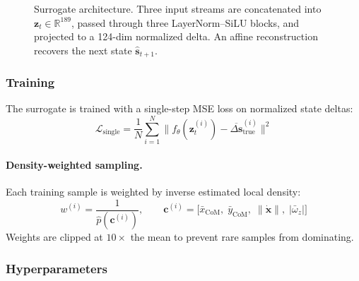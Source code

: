 \documentclass[11pt]{article}
\begin{document}
\begin{figure}[H]
  \caption{Surrogate architecture.  Three input streams are concatenated into $\mathbf{z}_t \in \mathbb{R}^{189}$, passed through three LayerNorm--SiLU blocks, and projected to a 124-dim normalized delta.  An affine reconstruction recovers the next state $\hat{\mathbf{s}}_{t+1}$.}
  \label{fig:surrogate-arch}
\end{figure}

\subsubsection{Training}
\label{sec:surrogate:model:training}

The surrogate is trained with a single-step MSE loss on normalized state deltas:
\begin{equation}
  \mathcal{L}_{\text{single}} = \frac{1}{N} \sum_{i=1}^{N} \bigl\| f_\theta(\mathbf{z}_t^{(i)}) - \overline{\Delta\mathbf{s}}_{\text{true}}^{(i)} \bigr\|^2
  \label{eq:surrogate-loss}
\end{equation}

\paragraph{Density-weighted sampling.}
Each training sample is weighted by inverse estimated local density:
\begin{equation}
  w^{(i)} = \frac{1}{\hat{p}(\mathbf{c}^{(i)})}, \qquad
  \mathbf{c}^{(i)} = \bigl[\bar{x}_{\text{CoM}},\; \bar{y}_{\text{CoM}},\; \|\dot{\mathbf{x}}\|,\; |\bar{\omega}_z|\bigr]
  \label{eq:density-weight}
\end{equation}
Weights are clipped at $10\times$ the mean to prevent rare samples from dominating.

\subsubsection{Hyperparameters}
\label{sec:surrogate:model:hyperparams}
\end{document}
